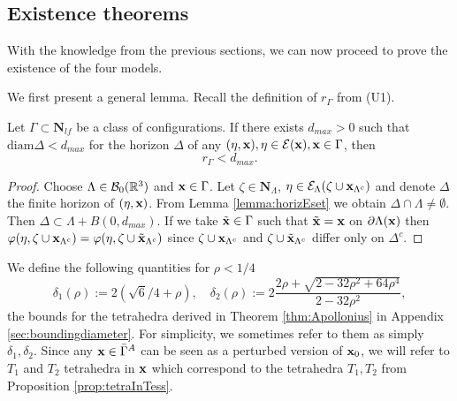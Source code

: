 \subsection{Existence theorems}\label{sec:Existence}
With the knowledge from the previous sections, we can now proceed to prove the existence of the four models.

We first present a general lemma. Recall the definition of $r_\Gamma$ from (U1). 
\begin{lemma}\label{lemma:U1}
	Let $\Gamma \subset \mathbf N_{lf}$ be a class of configurations. If there exists $d_{max}>0$ such that $\mathrm{diam}\Delta < d_{max}$ for the horizon $\Delta$ of any $(\eta,{\mathbf{x}}), \eta \in \mathcal E({\mathbf{x}}), {\mathbf{x}} \in \Gamma$, then 
	$$r_\Gamma < d_{max}.$$
\end{lemma}
\begin{proof}
	Choose $\Lambda\in \mathcal B_0({\mathbb R^3})$ and ${\mathbf{x}} \in \Gamma$. Let $\zeta \in \mathbf N_\Lambda$,  $\eta \in \mathcal E_\Lambda(\zeta \cup {\mathbf{x}}_{\Lambda^c})$ and denote $\Delta$ the finite horizon of $(\eta,{\mathbf{x}})$. From Lemma \ref{lemma:horizEset} we obtain $\Delta\cap\Lambda \neq \emptyset$. Then $\Delta \subset \Lambda + B(0,d_{max})$. If we take $\tilde{{\mathbf{x}}} \in \Gamma$ such that $\tilde{{\mathbf{x}}} = {\mathbf{x}}$ on $\partial\Lambda({\mathbf{x}})$ then $\varphi(\eta,\zeta \cup {\mathbf{x}}_{\Lambda^c}) = \varphi(\eta,\zeta\cup \tilde {{\mathbf{x}}}_{\Lambda^c})$ since $\zeta\cup{\mathbf{x}}_{\Lambda^c}$ and $\zeta\cup\tilde{{\mathbf{x}}}_{\Lambda^c}$ differ only on $\Delta^c$.
\end{proof}

\noindent We define the following quantities for $\rho<1/4$
$$\delta_1(\rho) := 2(\sqrt 6/4 + \rho),\quad \delta_2(\rho) := 2 \frac{2\rho + \sqrt{2 - 32\rho^2 + 64 \rho^4}}{2-32\rho^2},$$
the bounds for the tetrahedra derived in Theorem \ref{thm:Apollonius} in Appendix \ref{sec:boundingdiameter}. For simplicity, we sometimes refer to them as simply $\delta_1,\delta_2$. Since any ${\mathbf{x}} \in \bar\Gamma^A$ can be seen as a perturbed version of ${\mathbf{x}}_0$, we will refer to $T_1$ and $T_2$ tetrahedra in ${\mathbf{x}}$ which correspond to the tetrahedra $T_1,T_2$ from Proposition \ref{prop:tetraInTess}.

